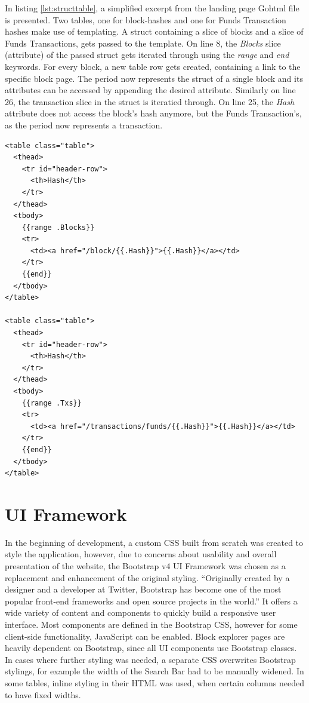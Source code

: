 In listing \ref{lst:structtable}, a simplified excerpt from the landing page Gohtml file is presented. Two tables, one for block-hashes and one for Funds Transaction hashes make use of templating. A struct containing a slice of blocks and a slice of Funds Transactions, gets passed to the template. On line 8, the \emph{Blocks} slice (attribute) of the passed struct gets iterated through using the \emph{range} and \emph{end} keywords. For every block, a new table row gets created, containing a link to the specific block page. The period now represents the struct of a single block and its attributes can be accessed by appending the desired attribute. Similarly on line 26, the transaction slice in the struct is iteratied through. On line 25, the \emph{Hash} attribute does not access the block's hash anymore, but the Funds Transaction's, as the period now represents a transaction.
\begin{lstlisting}[caption={Block and Funds Transaction Tables Accessing a \emph{blocksandtx} Struct},captionpos=b,label={lst:structtable}]
<table class="table">
  <thead>
    <tr id="header-row">
      <th>Hash</th>
    </tr>
  </thead>
  <tbody>
    {{range .Blocks}}
    <tr>
      <td><a href="/block/{{.Hash}}">{{.Hash}}</a></td>
    </tr>
    {{end}}
  </tbody>
</table>

<table class="table">
  <thead>
    <tr id="header-row">
      <th>Hash</th>
    </tr>
  </thead>
  <tbody>
    {{range .Txs}}
    <tr>
      <td><a href="/transactions/funds/{{.Hash}}">{{.Hash}}</a></td>
    </tr>
    {{end}}
  </tbody>
</table>
\end{lstlisting}

\section{UI Framework} \label{sec:uiframeworks}
In the beginning of development, a custom CSS built from scratch was created to style the application, however, due to concerns about usability and overall presentation of the website, the Bootstrap v4 UI Framework \cite{bootstrap} was chosen as a replacement and enhancement of the original styling.
``Originally created by a designer and a developer at Twitter, Bootstrap has become one of the most popular front-end frameworks and open source projects in the world.'' \cite{bootstraphistory}
It offers a wide variety of content and components to quickly build a responsive user interface. Most components are defined in the Bootstrap CSS, however for some client-side functionality, JavaScript can be enabled. Block explorer pages are heavily dependent on Bootstrap, since all UI components use Bootstrap classes. In cases where further styling was needed, a separate CSS overwrites Bootstrap stylings, for example the width of the Search Bar had to be manually widened. In some tables, inline styling in their HTML was used, when certain columns needed to have fixed widths.

